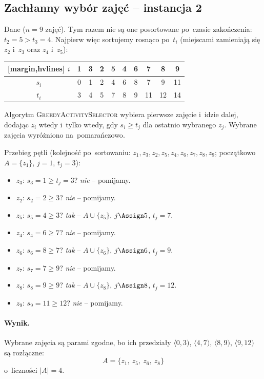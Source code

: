 \subsection{Zachłanny wybór zajęć -- instancja 2}

Dane ($n = 9$ zajęć). Tym razem nie są one posortowane po~czasie zakończenia:
$t_2 = 5 > t_3 = 4$. Najpierw więc sortujemy rosnąco po~$t_i$ (miejscami zamieniają się
$z_2$ i~$z_3$ oraz $z_4$ i~$z_5$):

\begin{aztable}
	\centering
	\renewcommand{\arraystretch}{1.2}
	\begin{NiceTabular}{c|ccccccccc}[margin,hvlines]
		$i$   & \color{accentB}1 & 3 & 2 & \color{accentB}5 & 4 & \color{accentB}6 & 7 & \color{accentB}8 & 9  \\
		\hline
		$s_i$ & \color{accentB}0 & 1 & 2 & \color{accentB}4 & 6 & \color{accentB}8 & 7 & \color{accentB}9 & 11 \\
		$t_i$ & \color{accentB}3 & 4 & 5 & \color{accentB}7 & 8 & \color{accentB}9 & 11& \color{accentB}12& 14
	\end{NiceTabular}
\end{aztable}

Algorytm \textsc{GreedyActivitySelector} wybiera pierwsze zajęcie i~idzie dalej,
dodając $z_i$ wtedy i~tylko wtedy, gdy $s_i \geq t_j$ dla ostatnio wybranego
$z_j$. Wybrane zajęcia wyróżniono na~\textcolor{accentB}{pomarańczowo}.

\begin{dygresja}
	Przebieg pętli (kolejność po~sortowaniu: $z_1, z_3, z_2, z_5, z_4, z_6, z_7, z_8, z_9$;
	początkowo $A = \{z_1\}$, $j = 1$, $t_j = 3$):
	\begin{itemize}
		\item $z_3$: $s_3 = 1 \geq t_j = 3$? \emph{nie} -- pomijamy.
		\item $z_2$: $s_2 = 2 \geq 3$? \emph{nie} -- pomijamy.
		\item $z_5$: $s_5 = 4 \geq 3$? \emph{tak} -- $A \cup \{z_5\}$, $j \Assign 5$, $t_j = 7$.
		\item $z_4$: $s_4 = 6 \geq 7$? \emph{nie} -- pomijamy.
		\item $z_6$: $s_6 = 8 \geq 7$? \emph{tak} -- $A \cup \{z_6\}$, $j \Assign 6$, $t_j = 9$.
		\item $z_7$: $s_7 = 7 \geq 9$? \emph{nie} -- pomijamy.
		\item $z_8$: $s_8 = 9 \geq 9$? \emph{tak} -- $A \cup \{z_8\}$, $j \Assign 8$, $t_j = 12$.
		\item $z_9$: $s_9 = 11 \geq 12$? \emph{nie} -- pomijamy.
	\end{itemize}
\end{dygresja}

\paragraph{Wynik.}
Wybrane zajęcia są parami zgodne, bo ich przedziały
$\langle 0, 3)$, $\langle 4, 7)$, $\langle 8, 9)$, $\langle 9, 12)$ są rozłączne:
\[
	\boxed{A = \{z_1,\ z_5,\ z_6,\ z_8\}}
\]
o~liczności $|A| = 4$.
